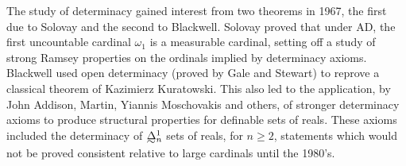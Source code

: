 \documentclass{book}%
\def\underTilde#1{{\baselineskip=0pt\vtop{\hbox{$#1$}\hbox{$\sim$}}}{}}
\begin{document}

The study of determinacy gained interest from two theorems in 1967, the first due to
Solovay and the second to Blackwell. Solovay proved that under AD,
the first uncountable cardinal $\omega_{1}$ is a measurable cardinal, setting off a study
of strong Ramsey properties on the ordinals implied by determinacy axioms. Blackwell used
open determinacy (proved by Gale and Stewart) to reprove a classical theorem of Kazimierz Kuratowski. This also
led to the application, by John Addison, Martin, Yiannis Moschovakis and others, of stronger determinacy axioms
to produce structural properties for definable sets of reals. These axioms included the
determinacy of $\underTilde{\Delta}^{1}_{n}$ sets of reals, for $n \geq 2$, statements which would not be proved
consistent relative to large cardinals until the 1980's.
\end{document}
